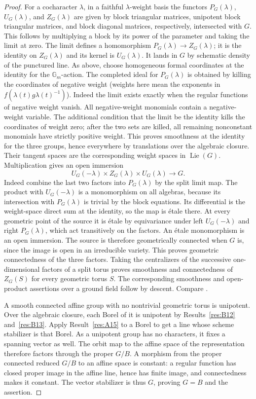 \documentclass[11pt,a4paper,openany,oneside]{book}
\theoremstyle{resultstyle}
\theoremstyle{definition}
\numberwithin{equation}{chapter}
\DeclareMathOperator{\Lie}{Lie}
\begin{document}
\begin{proof}
For a cocharacter \(\lambda\), in a faithful \(\lambda\)-weight
basis the functors \(P_G(\lambda)\), \(U_G(\lambda)\), and
\(Z_G(\lambda)\) are given by block triangular matrices,
unipotent block triangular matrices, and block diagonal
matrices, respectively, intersected with \(G\). This follows by
multiplying a block by its power of the parameter and taking
the limit at zero. The limit defines a homomorphism
\(P_G(\lambda)\to Z_G(\lambda)\); it is the identity on
\(Z_G(\lambda)\) and its kernel is \(U_G(\lambda)\).
It lands in \(G\) by schematic density of the punctured line.
As above, choose homogeneous formal coordinates at the identity
for the \(\mathbb G_m\)-action. The completed ideal for
\(P_G(\lambda)\) is obtained by killing the coordinates of
negative weight (weights here mean the exponents in
\(f(\lambda(t)g\lambda(t)^{-1})\)).
Indeed the limit exists exactly when the regular functions of
negative weight vanish. All negative-weight monomials contain a
negative-weight variable. The additional condition that the
limit be the identity kills the coordinates of weight zero;
after the two sets are killed, all remaining nonconstant monomials
have strictly positive weight. This proves smoothness at the
identity for the three groups, hence everywhere by translations
over the algebraic closure. Their tangent spaces are the
corresponding weight spaces in \(\Lie(G)\). Multiplication gives
an open immersion
\[
 U_G(-\lambda)\times Z_G(\lambda)\times U_G(\lambda)
 \longrightarrow G.
\]
Indeed combine the last two factors into \(P_G(\lambda)\) by
the split limit map. The product with \(U_G(-\lambda)\) is a
monomorphism on all algebras, because its intersection with
\(P_G(\lambda)\) is trivial by the block equations.
Its differential is the weight-space direct sum at the identity,
so the map is \'etale there. At every geometric point of the
source it is \'etale by equivariance under left
\(U_G(-\lambda)\) and right \(P_G(\lambda)\), which act
transitively on the factors. An \'etale monomorphism is an
open immersion. The source is therefore geometrically connected
when \(G\) is, since the image is open in an irreducible variety.
This proves geometric connectedness of the three factors.
Taking the centralizers of the successive one-dimensional factors
of a split torus proves smoothness and connectedness of \(Z_G(S)\)
for every geometric torus \(S\). The corresponding smoothness
and open-product assertions over a ground field follow by descent.
Compare \cite[Sections 13.a and 13.d]{milne}.

A smooth connected affine group with no nontrivial geometric
torus is unipotent. Over the algebraic closure, each Borel
of it is unipotent by Results~\ref{res:B12} and~\ref{res:B13}.
Apply Result~\ref{res:A15} to a Borel to get a line whose
scheme stabilizer is that Borel. As a unipotent group has no
characters, it fixes a spanning vector as well. The orbit
map to the affine space of the representation therefore factors
through the proper \(G/B\). A morphism from the proper connected
reduced \(G/B\) to an affine space is constant: a regular function
has closed proper image in the affine line, hence has finite
image, and connectedness makes it constant. The vector stabilizer
is thus \(G\), proving \(G=B\) and the assertion.


\end{proof}
\end{document}
